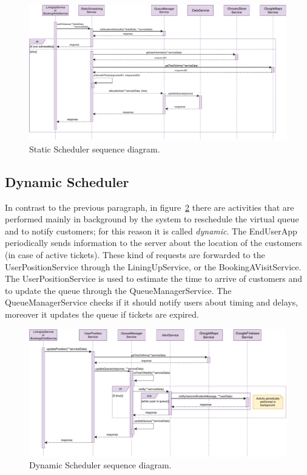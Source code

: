\begin{figure}[H]
    \centering
    \includegraphics[width=1.0\textwidth]{images/scheduler_sequence_diagram.pdf}
    \caption{Static Scheduler sequence diagram.}\label{fig:StaticScheduler}
\end{figure}

\subsection{Dynamic Scheduler}

In contrast to the previous paragraph, in figure~\ref{fig:DynamicScheduler} there are activities that are performed mainly in background by the system to reschedule the virtual queue and to notify customers; for this reason it is called \textit{dynamic}.
The EndUserApp periodically sends information to the server about the location of the customers (in case of active tickets). These kind of requests are forwarded to the UserPositionService through the LiningUpService, or the BookingAVisitService. The UserPositionService is used to estimate the time to arrive of customers and to update the queue through the QueueManagerService.
The QueueManagerService checks if it should notify users about timing and delays, moreover it updates the queue if tickets are expired.

\begin{figure}[H]
    \centering
    \includegraphics[width=1.0\textwidth]{images/dynamicScheduler_sequence_diagram.pdf}
    \caption{Dynamic Scheduler sequence diagram.}\label{fig:DynamicScheduler}
\end{figure}

